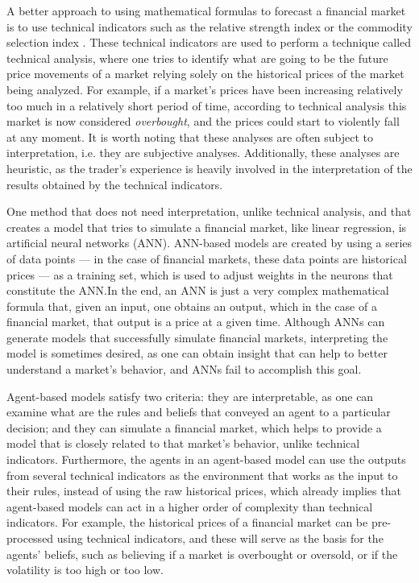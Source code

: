 \documentclass[review]{elsarticle}
\begin{document}
A better approach to using mathematical formulas to forecast a financial market
is to use technical indicators such as the relative strength index or the
commodity selection index \cite{Wilder1978}. These technical indicators are used
to perform a technique called technical analysis, where one tries to identify
what are going to be the future price movements of a market relying solely on
the historical prices of the market being analyzed. For example, if a market's
prices have been increasing relatively too much in a relatively short period of
time, according to technical analysis this market is now considered
\textit{overbought}, and the prices could start to violently fall at any
moment. It is worth noting that these analyses are often subject to
interpretation, i.e. they are subjective analyses. Additionally, these analyses
are heuristic, as the trader's experience is heavily involved in the
interpretation of the results obtained by the technical indicators.

One method that does not need interpretation, unlike technical analysis, and
that creates a model that tries to simulate a financial market, like linear
regression, is artificial neural networks (ANN). ANN-based models are created by
using a series of data points --- in the case of financial markets, these data
points are historical prices --- as a training set, which is used to adjust
weights in the neurons that constitute the ANN.\@ In the end, an ANN is just a
very complex mathematical formula that, given an input, one obtains an output,
which in the case of a financial market, that output is a price at a given
time. Although ANNs can generate models that successfully simulate financial
markets, interpreting the model is sometimes desired, as one can obtain insight
that can help to better understand a market's behavior, and ANNs fail to
accomplish this goal.

Agent-based models satisfy two criteria: they are interpretable, as one can
examine what are the rules and beliefs that conveyed an agent to a particular
decision; and they can simulate a financial market, which helps to provide a
model that is closely related to that market's behavior, unlike technical
indicators. %
Furthermore, the agents in an agent-based model can use the outputs from several
technical indicators as the environment that works as the input to their rules,
instead of using the raw historical prices, which already implies that
agent-based models can act in a higher order of complexity than technical
indicators. For example, the historical prices of a financial market can be
pre-processed using technical indicators, and these will serve as the basis for
the agents' beliefs, such as believing if a market is overbought or oversold, or
if the volatility is too high or too low.
\end{document}
